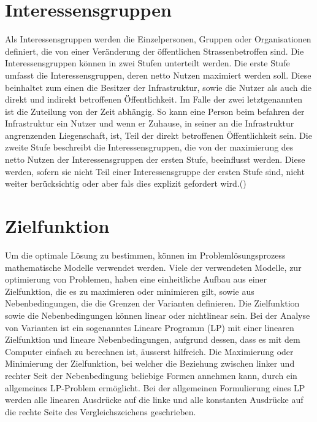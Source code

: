 \section{Interessensgruppen}
\label{sec:Inter.gruppen}

Als Interessensgruppen werden die Einzelpersonen, Gruppen oder Organisationen definiert, die von einer Veränderung der öffentlichen Strassenbetroffen sind. Die Interessensgruppen können in zwei Stufen unterteilt werden. Die erste Stufe umfasst die Interessensgruppen, deren netto Nutzen maximiert werden soll.  Diese beinhaltet zum einen die Besitzer der Infrastruktur, sowie die Nutzer als auch die direkt und indirekt betroffenen Öffentlichkeit. Im Falle der zwei letztgenannten ist die Zuteilung von der Zeit abhängig. So kann eine Person beim befahren der Infrastruktur ein Nutzer und wenn er Zuhause, in seiner an die Infrastruktur angrenzenden Liegenschaft, ist, Teil der direkt betroffenen Öffentlichkeit sein. Die zweite Stufe beschreibt die Interessensgruppen, die von der maximierung des netto Nutzen der Interessensgruppen der ersten Stufe, beeinflusst werden. Diese werden, sofern sie nicht Teil einer Interessensgruppe der ersten Stufe sind, nicht weiter berücksichtig oder aber fals dies explizit gefordert wird.(\cite{Adeyetall2019})

\section{Zielfunktion}
\label{sec:Zielf}

Um die optimale Lösung zu bestimmen, können im Problemlösungsprozess mathematische Modelle verwendet werden. Viele der verwendeten Modelle, zur optimierung von Problemen, haben eine einheitliche Aufbau aus einer Zielfunktion, die es zu maximieren oder minimieren gilt, sowie aus Nebenbedingungen, die die Grenzen der Varianten definieren. Die Zielfunktion sowie die Nebenbedingungen können linear oder nichtlinear sein.
Bei der Analyse von Varianten ist ein sogenanntes Lineare Programm (LP) mit einer linearen Zielfunktion und lineare Nebenbedingungen, aufgrund dessen, dass es mit dem Computer einfach zu berechnen ist, äusserst hilfreich.
Die Maximierung oder Minimierung der Zielfunktion, bei welcher die Beziehung zwischen linker und rechter Seit der Nebenbedingung beliebige Formen annehmen kann, durch ein allgemeines LP-Problem ermöglicht. Bei der allgemeinen Formulierung eines LP werden alle linearen Ausdrücke auf die linke und alle konstanten Ausdrücke auf die rechte Seite des Vergleichszeichens geschrieben. \cite{Adey2019}

